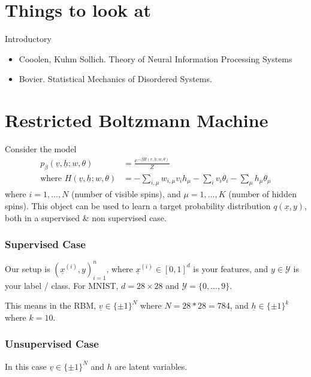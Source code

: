\section{Things to look at}
Introductory
\begin{itemize}
	\item Cooolen, Kuhm Sollich. Theory of Neural Information Processing Systems
	\item Bovier. Statistical Mechanics of Disordered Systems.
\end{itemize}


\section{Restricted Boltzmann Machine}
Consider the model
\begin{align}
	p_\beta(\underline v, \underline h; w,\theta) & = \frac{e^{-\beta H(\underline v, \underline h; w,\theta)}}{Z}\\
	\text{where }H(\underline v, \underline h; w,\theta) & = - \sum_{i, \mu} w_{i,\mu} v_i h_\mu - \sum_i v_i \theta_i - \sum_\mu h_\mu \theta_\mu
\end{align}
where $i = 1,..., N$ (number of visible spins), and $\mu = 1,..., K$ (number of hidden spins). This object can be used to learn a target probability distribution $q(\underline x, y)$, both in a supervised \& non supervised case.
\subsubsection{Supervised Case}
Our setup is $(\underline x^{(i)},y)_{i=1}^n$, where $\underline x^{(i)} \in [0,1]^d$ is your features, and $y \in \mathcal Y$ is your label / class. For MNIST, $d = 28 \times 28$ and $\mathcal Y = \{0,...,9\}$.

This means in the RBM, $\underline v \in \{\pm 1\}^N$ where $N = 28*28 =784$, and $\underline h \in \{\pm 1\}^k$ where $k = 10$.

\subsubsection{Unsupervised Case}
In this case $\underline v \in \{\pm 1\}^N$ and $h$ are latent variables.


